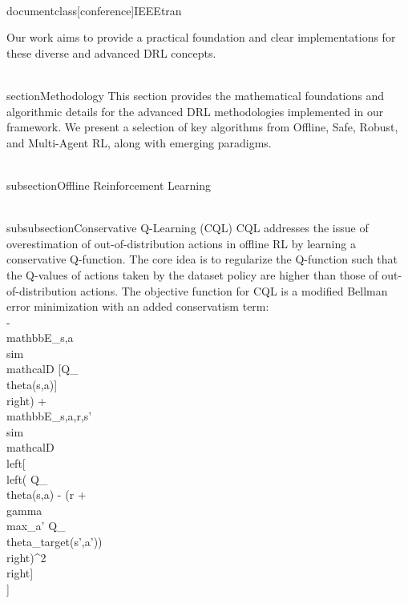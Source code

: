 \\documentclass[conference]{IEEEtran}
\begin{document}
Our work aims to provide a practical foundation and clear implementations for these diverse and advanced DRL concepts.

\\section{Methodology}
This section provides the mathematical foundations and algorithmic details for the advanced DRL methodologies implemented in our framework. We present a selection of key algorithms from Offline, Safe, Robust, and Multi-Agent RL, along with emerging paradigms.

\\subsection{Offline Reinforcement Learning}

\\subsubsection{Conservative Q-Learning (CQL)}
CQL addresses the issue of overestimation of out-of-distribution actions in offline RL by learning a conservative Q-function. The core idea is to regularize the Q-function such that the Q-values of actions taken by the dataset policy are higher than those of out-of-distribution actions.
The objective function for CQL is a modified Bellman error minimization with an added conservatism term:
\\[
\\min_{\\theta} \\alpha \\left( \\mathbb{E}_{s \\sim \\mathcal{D}, a \\sim \\pi_{\\beta}} [Q_{\\theta}(s,a)] - \\mathbb{E}_{s,a \\sim \\mathcal{D}} [Q_{\\theta}(s,a)] \\right) + \\mathbb{E}_{s,a,r,s' \\sim \\mathcal{D}} \\left[ \\left( Q_{\\theta}(s,a) - (r + \\gamma \\max_{a'} Q_{\\theta_{target}}(s',a')) \\right)^2 \\right]
\\]
\end{document}
